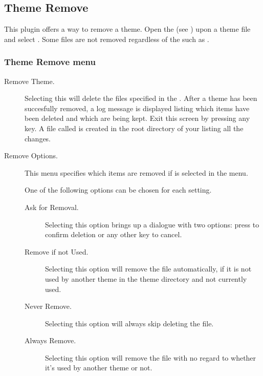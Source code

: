 \subsection{\label{ref:ThemeRemove}Theme Remove}
This plugin offers a way to remove a theme. Open the  (see ) 
upon a theme file and select .
Some files are not removed regardless of the  such as
.

\subsubsection{Theme Remove menu}
\begin{description}
  \item[Remove Theme.]
  Selecting this will delete the files specified in the .
  After a theme has been succesfully removed, a log message is displayed listing 
  which items have been deleted and which are being kept. Exit this screen by 
  pressing any key. A file called  is created in 
  the root directory of your \dap{} listing all the changes.

  \item[Remove Options.]
  This menu specifies which items are removed if
   is selected in the menu.

  One of the following options can be chosen for each setting.
  \begin{description}
    \item[Ask for Removal.]
    Selecting this option brings up a dialogue with two options:
    press \ActionYesNoAccept{} to confirm deletion or any other key to cancel.
    \item[Remove if not Used.]
    Selecting this option will remove the file automatically, if it is not 
    used by another theme in the theme directory and not currently used.
    \item[Never Remove.]
    Selecting this option will always skip deleting the file.
    \item[Always Remove.]
    Selecting this option will remove the file with no regard to
    whether it's used by another theme or not.
  \end{description}


\end{description}
